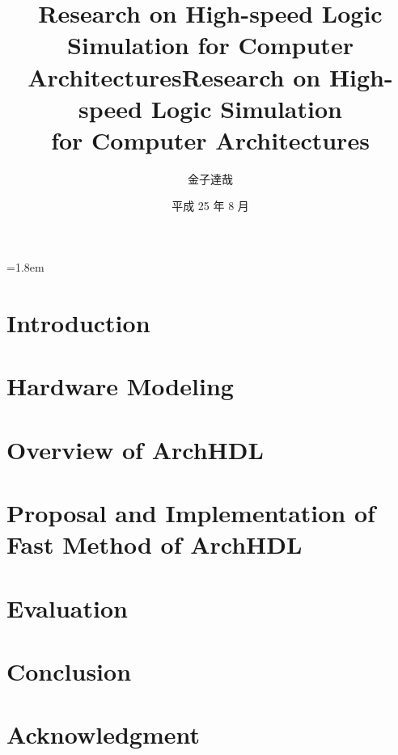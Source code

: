 \documentclass[12pt,openany,papersize,english]{jsbook}
\title{Research on High-speed Logic Simulation for Computer Architectures}
\affiliation{情報工学科}
\title{Research on High-speed Logic Simulation \\ for Computer Architectures}
\author{金子達哉}
\date{平成 25 年 8 月}
\begin{document}
\parindent=1.8em
\maketitle

\frontmatter

\tableofcontents

\mainmatter

\chapter{Introduction}



\chapter{Hardware Modeling}



\chapter{Overview of ArchHDL}

\label{c:summary}



\chapter{Proposal and Implementation of Fast Method of ArchHDL}

\label{c:method}



\chapter{Evaluation}

\label{c:evaluation}



\chapter{Conclusion}

\label{c:conclusion}



\backmatter

\chapter{Acknowledgment}

\label{c:acknowledgment}



\label{c:relatedwork}


\end{document}
